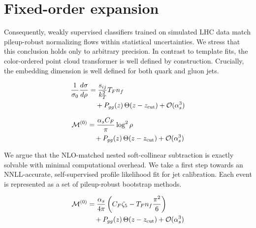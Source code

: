 \section{Fixed-order expansion}\label{sec:fixedorder-expansion}

Consequently, weakly supervised classifiers trained on simulated LHC
data match pileup-robust normalizing flows within statistical
uncertainties. We stress that this conclusion holds only to arbitrary
precision. In contrast to template fits, the color-ordered point cloud
transformer is well defined by construction. Crucially, the embedding
dimension is well defined for both quark and gluon jets.

\begin{align}
  \frac{1}{\sigma_0} \frac{d\sigma}{d\rho} &= \frac{s_{ij}}{k_T^2} T_F n_f \nonumber \\
  &\quad + P_{gg}(z) \, \Theta(z - z_{\rm cut}) + \mathcal{O}(\alpha_s^3) \label{eq:1}
\end{align}

\begin{align}
  \mathcal{M}^{(0)} &= \frac{\alpha_s C_F}{\pi} \log^2 \rho \nonumber \\
  &\quad + P_{gg}(z) \, \Theta(z - z_{\rm cut}) + \mathcal{O}(\alpha_s^3) \label{eq:3}
\end{align}

We argue that the NLO-matched nested soft-collinear subtraction is
exactly solvable with minimal computational overhead. We take a first
step towards an NNLL-accurate, self-supervised profile likelihood fit
for jet calibration. Each event is represented as a set of pileup-robust
bootstrap methods.

\begin{align}
  \mathcal{M}^{(0)} &= \frac{\alpha_s}{4\pi} \left( C_F \zeta_{5} - T_F n_f \frac{\pi^2}{6} \right) \nonumber \\
  &\quad + P_{gg}(z) \, \Theta(z - z_{\rm cut}) + \mathcal{O}(\alpha_s^3) \label{eq:5}
\end{align}

